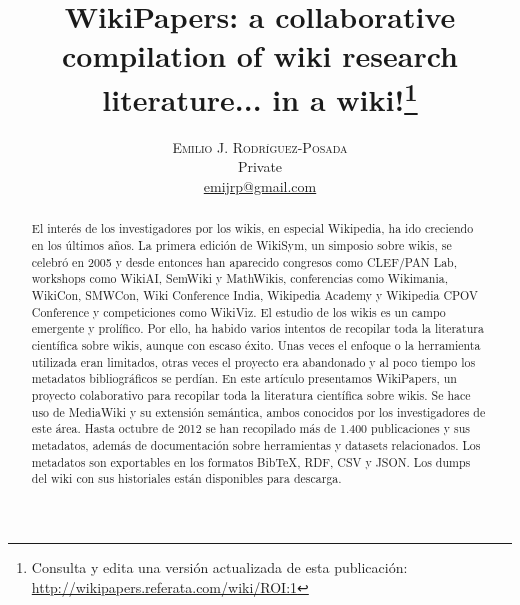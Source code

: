\documentclass[twoside]{article}
\title{\vspace{-15mm}%
	\fontsize{24pt}{10pt}\selectfont
	\textbf{WikiPapers: a collaborative compilation of wiki research literature... in a wiki!}\thanks{Consulta y edita una versi\'{o}n actualizada de esta publicaci\'{o}n: \href{http://wikipapers.referata.com/wiki/ROI:1}{http://wikipapers.referata.com/wiki/ROI:1}} \\[2mm]
	}
\author{%
	\large
	\textsc{Emilio J. Rodr\'{i}guez-Posada} \\
	\normalsize	Private \\
	\normalsize	\href{mailto:emijrp@gmail.com}{emijrp@gmail.com}
	\vspace{-5mm}
	}
\date{}
\begin{document}
\maketitle
\thispagestyle{fancy}

\begin{abstract}
\noindent El inter\'{e}s de los investigadores por los wikis, en especial Wikipedia, ha ido creciendo en los \'{u}ltimos a\~{n}os. La primera edici\'{o}n de WikiSym, un simposio sobre wikis, se celebr\'{o} en 2005 y desde entonces han aparecido congresos como CLEF/PAN Lab, workshops como WikiAI, SemWiki y MathWikis, conferencias como Wikimania, WikiCon, SMWCon, Wiki Conference India, Wikipedia Academy y Wikipedia CPOV Conference y competiciones como WikiViz. El estudio de los wikis es un campo emergente y prol\'{i}fico. Por ello, ha habido varios intentos de recopilar toda la literatura cient\'{i}fica sobre wikis, aunque con escaso \'{e}xito. Unas veces el enfoque o la herramienta utilizada eran limitados, otras veces el proyecto era abandonado y al poco tiempo los metadatos bibliogr\'{a}ficos se perd\'{i}an. En este art\'{i}culo presentamos WikiPapers, un proyecto colaborativo para recopilar toda la literatura cient\'{i}fica sobre wikis. Se hace uso de MediaWiki y su extensi\'{o}n sem\'{a}ntica, ambos conocidos por los investigadores de este \'{a}rea. Hasta octubre de 2012 se han recopilado m\'{a}s de 1.400 publicaciones y sus metadatos, adem\'{a}s de documentaci\'{o}n sobre herramientas y datasets relacionados. Los metadatos son exportables en los formatos BibTeX, RDF, CSV y JSON. Los dumps del wiki con sus historiales est\'{a}n disponibles para descarga.
\end{abstract}
	
\end{document}

